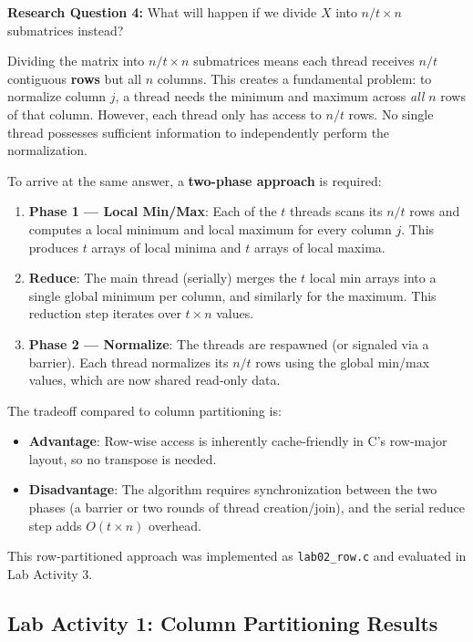 \documentclass[journal]{IEEEtran}
\begin{document}
\textbf{Research Question 4:} What will happen if we divide $X$ into $n/t \times n$ submatrices instead?

Dividing the matrix into $n/t \times n$ submatrices means each thread receives $n/t$ contiguous \textbf{rows} but all $n$ columns. This creates a fundamental problem: to normalize column $j$, a thread needs the minimum and maximum across \textit{all} $n$ rows of that column. However, each thread only has access to $n/t$ rows. No single thread possesses sufficient information to independently perform the normalization.

To arrive at the same answer, a \textbf{two-phase approach} is required:

\begin{enumerate}
    \item \textbf{Phase 1 --- Local Min/Max}: Each of the $t$ threads scans its $n/t$ rows and computes a local minimum and local maximum for every column $j$. This produces $t$ arrays of local minima and $t$ arrays of local maxima.
    
    \item \textbf{Reduce}: The main thread (serially) merges the $t$ local min arrays into a single global minimum per column, and similarly for the maximum. This reduction step iterates over $t \times n$ values.
    
    \item \textbf{Phase 2 --- Normalize}: The threads are respawned (or signaled via a barrier). Each thread normalizes its $n/t$ rows using the global min/max values, which are now shared read-only data.
\end{enumerate}

The tradeoff compared to column partitioning is:
\begin{itemize}
    \item \textbf{Advantage}: Row-wise access is inherently cache-friendly in C's row-major layout, so no transpose is needed.
    \item \textbf{Disadvantage}: The algorithm requires synchronization between the two phases (a barrier or two rounds of thread creation/join), and the serial reduce step adds $O(t \times n)$ overhead.
\end{itemize}

This row-partitioned approach was implemented as \texttt{lab02\_row.c} and evaluated in Lab Activity 3.

\subsection{Lab Activity 1: Column Partitioning Results}
\end{document}
